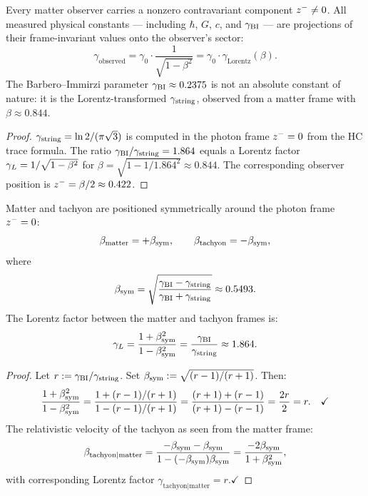 \begin{theorem}\label{thm:frame-offset}
Every matter observer carries a nonzero contravariant component
$z^-\neq 0$.
All measured physical constants --- including $\hbar$, $G$, $c$, and
$\gamma_{\mathrm{BI}}$ --- are projections of their frame-invariant values onto the
observer's sector:
\[
 \gamma_{\mathrm{observed}}
 = \gamma_0\cdot\frac{1}{\sqrt{1-\beta^2}}
 = \gamma_0\cdot\gamma_{\mathrm{Lorentz}}(\beta).
\]
The Barbero--Immirzi parameter $\gamma_{\mathrm{BI}}\approx 0.2375$ is not an absolute
constant of nature: it is the Lorentz-transformed $\gamma_{\mathrm{string}}$, observed
from a matter frame with $\beta\approx 0.844$.
\end{theorem}

\begin{proof}
$\gamma_{\mathrm{string}} = \ln 2/(\pi\sqrt{3})$ is computed in the photon frame
$z^-=0$ from the HC trace formula.
The ratio $\gamma_{\mathrm{BI}}/\gamma_{\mathrm{string}} = 1.864$ equals a Lorentz factor
$\gamma_L = 1/\sqrt{1-\beta^2}$ for $\beta=\sqrt{1-1/1.864^2}\approx 0.844$.
The corresponding observer position is $z^-=\beta/2\approx 0.422$.
\end{proof}


\begin{theorem}\label{thm:symmetric-frame}
Matter and tachyon are positioned symmetrically around the photon frame
$z^-=0$:
\[
 \beta_{\mathrm{matter}} = +\beta_{\mathrm{sym}},\qquad
 \beta_{\mathrm{tachyon}} = -\beta_{\mathrm{sym}},
\]
where
\[
 \beta_{\mathrm{sym}} = \sqrt{\frac{\gamma_{\mathrm{BI}}-\gamma_{\mathrm{string}}}{\gamma_{\mathrm{BI}}+\gamma_{\mathrm{string}}}}\approx 0.5493.
\]
The Lorentz factor between the matter and tachyon frames is:
\[
 \gamma_L = \frac{1+\beta_{\mathrm{sym}}^2}{1-\beta_{\mathrm{sym}}^2}
 = \frac{\gamma_{\mathrm{BI}}}{\gamma_{\mathrm{string}}}\approx 1.864.
\]
\end{theorem}

\begin{proof}
Let $r:=\gamma_{\mathrm{BI}}/\gamma_{\mathrm{string}}$. Set $\beta_{\mathrm{sym}}:=\sqrt{(r-1)/(r+1)}$. Then:
\[
 \frac{1+\beta_{\mathrm{sym}}^2}{1-\beta_{\mathrm{sym}}^2}
 =\frac{1+(r-1)/(r+1)}{1-(r-1)/(r+1)}
 =\frac{(r+1)+(r-1)}{(r+1)-(r-1)}=\frac{2r}{2}=r.\quad\checkmark
\]
The relativistic velocity of the tachyon as seen from the matter frame:
\[
 \beta_{\mathrm{tachyon}|\mathrm{matter}}
 =\frac{-\beta_{\mathrm{sym}}-\beta_{\mathrm{sym}}}{1-(-\beta_{\mathrm{sym}})\beta_{\mathrm{sym}}}
 =\frac{-2\beta_{\mathrm{sym}}}{1+\beta_{\mathrm{sym}}^2},
\]
with corresponding Lorentz factor $\gamma_{\mathrm{tachyon}|\mathrm{matter}}=r$.\quad$\checkmark$
\end{proof}



